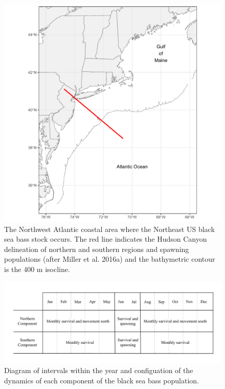 \documentclass[
]{article}
\begin{document}
\begin{figure}

{\centering \includegraphics[width=1\linewidth]{map} 

}

\caption{The Northwest Atlantic coastal area where the Northeast US black sea bass stock occurs. The red line indicates the Hudson Canyon delineation of northern and southern regions and spawning populations (after Miller et al. 2016a) and the bathymetric contour is the 400 m isocline.}\label{fig:map}
\end{figure}
\pagebreak

\begin{figure}

{\centering \includegraphics[width=0.8\linewidth]{bsb_movement_diagram} 

}

\caption{Diagram of intervals within the year and configuation of the dynamics of each component of the black sea bass population.}\label{fig:migration-diagram}
\end{figure}
\pagebreak
\end{document}
